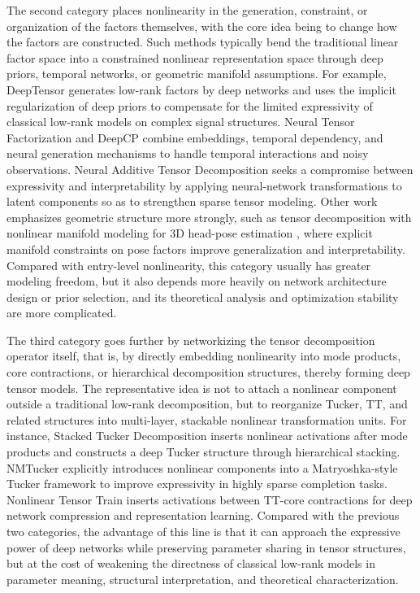 The second category places nonlinearity in the generation, constraint, or organization of the factors themselves, with the core idea being to change how the factors are constructed. Such methods typically bend the traditional linear factor space into a constrained nonlinear representation space through deep priors, temporal networks, or geometric manifold assumptions. For example, DeepTensor \cite{saragadam2024deeptensor} generates low-rank factors by deep networks and uses the implicit regularization of deep priors to compensate for the limited expressivity of classical low-rank models on complex signal structures. Neural Tensor Factorization \cite{wu2019neural} and DeepCP \cite{liu2017deepcp} combine embeddings, temporal dependency, and neural generation mechanisms to handle temporal interactions and noisy observations. Neural Additive Tensor Decomposition \cite{ahn2024neural} seeks a compromise between expressivity and interpretability by applying neural-network transformations to latent components so as to strengthen sparse tensor modeling. Other work emphasizes geometric structure more strongly, such as tensor decomposition with nonlinear manifold modeling for 3D head-pose estimation \cite{derkach2019tensor}, where explicit manifold constraints on pose factors improve generalization and interpretability. Compared with entry-level nonlinearity, this category usually has greater modeling freedom, but it also depends more heavily on network architecture design or prior selection, and its theoretical analysis and optimization stability are more complicated.

The third category goes further by networkizing the tensor decomposition operator itself, that is, by directly embedding nonlinearity into mode products, core contractions, or hierarchical decomposition structures, thereby forming deep tensor models. The representative idea is not to attach a nonlinear component outside a traditional low-rank decomposition, but to reorganize Tucker, TT, and related structures into multi-layer, stackable nonlinear transformation units. For instance, Stacked Tucker Decomposition \cite{xu2024stacked} inserts nonlinear activations after mode products and constructs a deep Tucker structure through hierarchical stacking. NMTucker \cite{varolgunes2023nmtucker} explicitly introduces nonlinear components into a Matryoshka-style Tucker framework to improve expressivity in highly sparse completion tasks. Nonlinear Tensor Train \cite{wang2021nonlinear} inserts activations between TT-core contractions for deep network compression and representation learning. Compared with the previous two categories, the advantage of this line is that it can approach the expressive power of deep networks while preserving parameter sharing in tensor structures, but at the cost of weakening the directness of classical low-rank models in parameter meaning, structural interpretation, and theoretical characterization.

